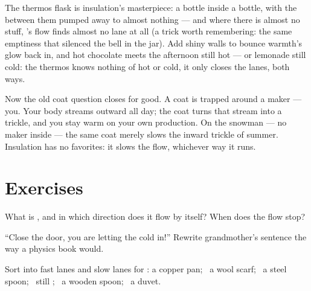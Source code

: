 \begin{example}\label{ex:g5:heat-and-insulation:thermos}
The thermos flask is insulation's masterpiece: a bottle inside a
bottle, with the  between them pumped away to almost nothing
--- and where there is almost no stuff, 's flow finds almost
no lane at all (a trick worth remembering: the same emptiness that
silenced the bell in the jar). Add shiny walls to bounce warmth's
glow back in, and hot chocolate meets the afternoon still hot ---
or lemonade still cold: the thermos knows nothing of hot or cold,
it only closes the lanes, both ways.
\end{example}

\begin{remark}\label{rem:g5:heat-and-insulation:coat}
Now the old coat question closes for good. A coat is trapped 
around a  maker --- you. Your body streams  outward all
day; the coat turns that stream into a trickle, and you stay warm
on your own production. On the snowman --- no  maker inside
--- the same coat merely slows the inward trickle of summer.
Insulation has no favorites: it slows the flow, whichever way it
runs.
\end{remark}

\section{Exercises}

\begin{exercise}[$\star$]\label{exo:g5:heat-and-insulation:1}
What is , and in which direction does it flow by itself? When
does the flow stop?
\end{exercise}

\begin{exercise}[$\star$]\label{exo:g5:heat-and-insulation:2}
``Close the door, you are letting the cold in!'' Rewrite
grandmother's sentence the way a physics book would.
\end{exercise}

\begin{exercise}[$\star$]\label{exo:g5:heat-and-insulation:3}
Sort into fast lanes and slow lanes for : a copper pan; \ a
wool scarf; \ a steel spoon; \ still ; \ a wooden spoon; \ a
duvet.
\end{exercise}

